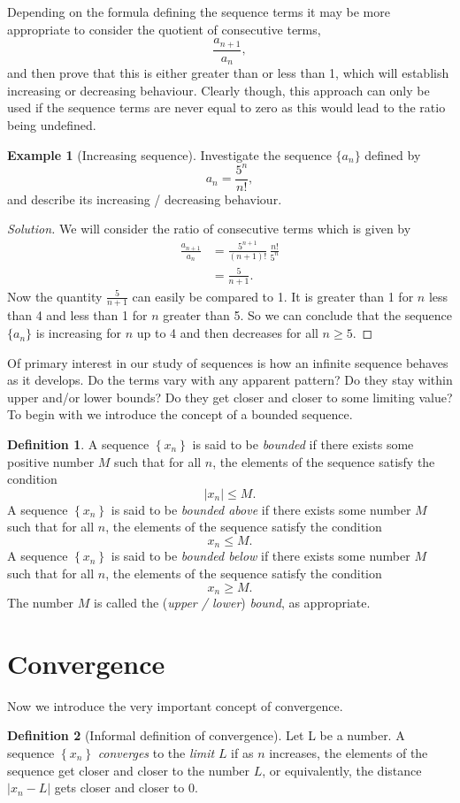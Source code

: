 \documentclass[extrafontsizes, twoside, a4paper]{memoir}
\theoremstyle{plain}%
\theoremstyle{definition}
\newtheorem{defn}{Definition}[chapter]
\newtheorem{exmp}{Example}[chapter]
\theoremstyle{remark}
\begin{document}
Depending on the formula defining the sequence terms it may be more appropriate to consider the quotient of consecutive terms,
$$ \frac{a_{n+1}}{a_n} ,$$
and then prove that this is either greater than or less than 1, which will establish increasing or decreasing behaviour. Clearly though, this approach can only be used if the sequence terms are never equal to zero as this would lead to the ratio being undefined.

\begin{exmp}[Increasing sequence]
Investigate the sequence $\{ a_n \}$ defined by
$$ a_n = \frac{5^n}{n!},$$
and describe its increasing / decreasing behaviour.
\end{exmp}
\begin{proof}[Solution]
We will consider the ratio of consecutive terms which is given by
\begin{align*}
\frac{a_{n+1}}{a_n} & = \frac{5^{n+1}}{(n+1)!} \, \frac{n!}{5^n} \\
&= \frac{5}{n+1} .
\end{align*}
Now the quantity $\frac{5}{n+1}$ can easily be compared to 1. It is greater than 1 for $n$ less than 4 and less than 1 for $n$ greater than 5. So we can conclude that the sequence $\{ a_n \}$ is increasing for $n$ up to 4 and then decreases for all $n \geq 5$.
\end{proof}
Of primary interest in our study of sequences is how an infinite sequence behaves as it develops. Do the terms vary with any apparent pattern? Do they stay within upper and/or lower bounds? Do they get closer and closer to some limiting value? To begin with we introduce the concept of a bounded sequence.
\begin{defn}
A sequence $\left \{ x_n \right \}$ is said to be \emph{bounded} if there exists some positive number $M$ such that for all $n$, the elements of the sequence satisfy the condition
$$ \left | x_n \right | \leq M.$$
A sequence $\left \{ x_n \right \}$ is said to be \emph{bounded above } if there exists some  number $M$ such that for all $n$, the elements of the sequence satisfy the condition
$$ x_n  \leq M.$$
A sequence $\left \{ x_n \right \}$ is said to be \emph{bounded below} if there exists some  number $M$ such that for all $n$, the elements of the sequence satisfy the condition
$$ x_n  \geq M.$$
The number $M$ is called the (\emph{upper / lower}) \emph{bound}, as appropriate.
\end{defn}
\section{Convergence}
Now we introduce the very important concept of convergence.
\begin{defn}[Informal definition of convergence]
Let L be a number. A sequence $\left \{ x_n \right \}$ \emph{converges} to the \emph{limit} $L$ if as $n$ increases, the
elements of the sequence get closer and closer to the number $L$, or equivalently, the distance $ \left | x_n - L \right |$ gets closer and closer to $0$.
\end{defn}
\end{document}
